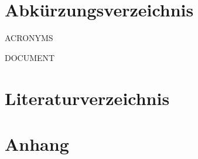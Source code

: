 \documentclass[11pt,oneside,titlepage,listof=totoc,bibliography=totoc]{scrartcl}
\begin{document}
\setcounter{tocdepth}{4}
\tableofcontents
\thispagestyle{empty}
\newpage
\clearpage

\setcounter{page}{0}
\thispagestyle{empty}
\listoffigures
\newpage
\clearpage

\setcounter{page}{0}

\section*{Abkürzungsverzeichnis}
\begin{acronym}[WYSIWYG]\itemsep0pt %
{{ ACRONYMS }}
\end{acronym}
\newpage



{{ DOCUMENT }}


\newpage
{}
\section*{Literaturverzeichnis}

\section*{Anhang}
\newpage

\newpage
\end{document}
